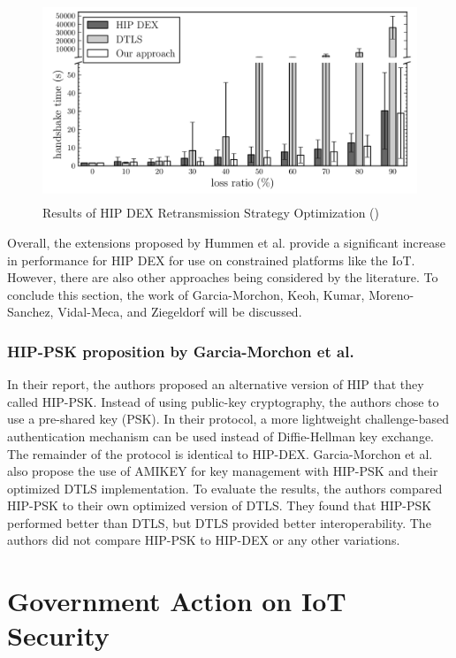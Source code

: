 \documentclass[letterpaper, 12pt]{article}
\begin{document}
\begin{flushleft}
\begin{figure}[H]
	\includegraphics[width=\linewidth,height=6cm,keepaspectratio]{figure7.png}
	\caption{Results of HIP DEX Retransmission Strategy Optimization (\cite{Hummen})}
	\label{fig:arch}
\end{figure}

Overall, the extensions proposed by Hummen et al. provide a significant increase in performance for HIP DEX for use on constrained platforms like the 
IoT. However, there are also other approaches being considered by the literature. To conclude this section, the work of Garcia-Morchon, Keoh, Kumar,
Moreno-Sanchez, Vidal-Meca, and Ziegeldorf will be discussed. 

\subsubsection*{HIP-PSK proposition by Garcia-Morchon et al.}
In their report, the authors proposed an alternative version of HIP that they called HIP-PSK. Instead of using public-key cryptography, the authors chose
to use a pre-shared key (PSK). In their protocol, a more lightweight challenge-based authentication mechanism can be used instead of Diffie-Hellman key
exchange. The remainder of the protocol is identical to HIP-DEX. Garcia-Morchon et al. also propose the use of AMIKEY for key management with HIP-PSK
and their optimized DTLS implementation. To evaluate the results, the authors compared HIP-PSK to their own optimized version of DTLS. They found that 
HIP-PSK performed better than DTLS, but DTLS provided better interoperability. The authors did not compare HIP-PSK to HIP-DEX or any other variations. 

\section*{Government Action on IoT Security}


\end{flushleft}
\end{document}
